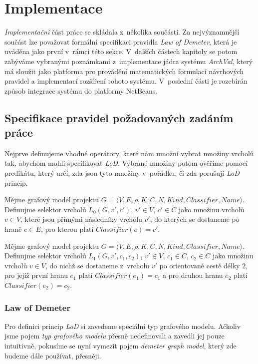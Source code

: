 \chapter{Implementace}
\label{implementation}
\emph{Implementační} část práce se skládala z~několika součástí. Za nejvýznamnější součást lze považovat formální specifikaci pravidla \emph{Law of Demeter}, která je uváděna jako první v~rámci této sekce. V~dalších částech kapitoly se potom zabýváme vybranými poznámkami z~implementace jádra systému \emph{ArchVal}, který má sloužit jako platforma pro provádění matematických formulací návrhových pravidel a implementací rozšíření tohoto systému. V~poslední části je rozebírán způsob integrace systému do platformy NetBeans.

\section{Specifikace pravidel požadovaných zadáním práce}
Nejprve definujeme vhodné operátory, které nám umožní vybrat množiny vrcholů tak, abychom mohli specifikovat \emph{LoD}. Vybrané množiny potom ověříme pomocí predikátu, který určí, zda jsou tyto množiny v~pořádku, či zda porušují \emph{LoD} princip.

\begin{definition}
Mějme grafový model projektu $G = \langle V, E, \rho, K, C, N, \mathit{Kind}, \mathit{Classifier}, \mathit{Name}\rangle$. Definujme selektor vrcholů $L_0(G, v', c')$, $v' \in V$, $c' \in C$ jako množinu vrcholů $v \in V$, které jsou přímými následníky vrcholu $v'$, do kterých se dostaneme po hraně $e \in E$, pro kterou platí $Classifier(e) = c' $.
\end{definition}

\begin{definition}
Mějme grafový model projektu $G = \langle V, E, \rho, K, C, N, \mathit{Kind}, \mathit{Classifier}, \mathit{Name}\rangle$. Definujme selektor vrcholů $L_1(G, v', c_1, c_2)$, $v' \in V$, $c_1 \in C$, $c_2 \in C$ jako množinu vrcholů $v \in V$, do nichž se dostaneme z~vrcholu $v'$ po orientované cestě délky 2, pro jejíž první hranu $e_1$ platí $Classifier(e_1) = c_1$ a pro druhou hranu $e_2$ platí $Classifier(e_2) = c_2$.
\end{definition}

\subsection{Law of Demeter}
\label{implementation-lod_specification}
Pro definici princip \emph{LoD} si zavedeme speciální typ grafového modelu. Ačkoliv jsme pojem \emph{typ grafového modelu}  přesně nedefinovali a zavedli jej pouze intuitivně, pokusíme se nyní vymezit pojem \emph{demeter graph model}, který zde budeme dále používat, přesněji.


